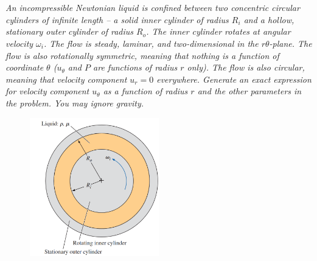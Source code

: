 \section{}

\textit{An incompressible Newtonian liquid is confined between two concentric circular cylinders of infinite length – a solid inner cylinder of radius $R_i$ and a hollow, stationary outer cylinder of radius $R_o$. The inner cylinder rotates at angular velocity $\omega_i$. The flow is steady, laminar, and two-dimensional in the $r\theta$-plane. The flow is also rotationally symmetric, meaning that nothing is a function of coordinate $\theta$ ($u_{\theta}$ and $P$ are functions of radius $r$ only). The flow is also circular, meaning that velocity component $u_r = 0$ everywhere. Generate an exact expression for velocity component $u_{\theta}$ as a function of radius $r$ and the other parameters in the problem. You may ignore gravity.}

\begin{figure}[h]
    \centering
    \includegraphics[width=0.5\textwidth]{Questions/Figures/Q2 Problem Diagram.png}
\end{figure}
\FloatBarrier
